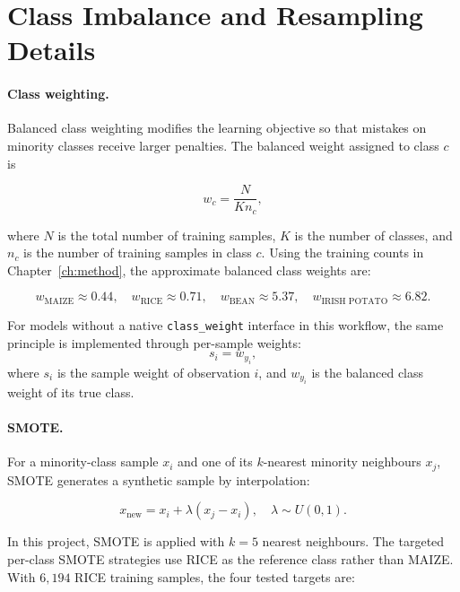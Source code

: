 \section{Class Imbalance and Resampling Details}

\paragraph{Class weighting.}
Balanced class weighting modifies the learning objective so that mistakes
on minority classes receive larger penalties. The balanced weight assigned
to class \(c\) is

\begin{equation}
\label{eq:class_weight}
w_c =
\frac{N}{K n_c},
\end{equation}

where \(N\) is the total number of training samples, \(K\) is the number
of classes, and \(n_c\) is the number of training samples in class \(c\).
Using the training counts in Chapter~\ref{ch:method}, the approximate
balanced class weights are:

\[
w_{\text{MAIZE}} \approx 0.44,\quad
w_{\text{RICE}} \approx 0.71,\quad
w_{\text{BEAN}} \approx 5.37,\quad
w_{\text{IRISH POTATO}} \approx 6.82.
\]

For models without a native \texttt{class\_weight} interface in this
workflow, the same principle is implemented through per-sample weights:
\begin{equation}
\label{eq:sample_weight}
s_i = w_{y_i},
\end{equation}
where \(s_i\) is the sample weight of observation \(i\), and \(w_{y_i}\)
is the balanced class weight of its true class.

\paragraph{SMOTE.}
For a minority-class sample \(x_i\) and one of its \(k\)-nearest minority
neighbours \(x_j\), SMOTE generates a synthetic sample by interpolation:

\begin{equation}
\label{eq:smote_formula}
x_{\mathrm{new}}
=
x_i + \lambda (x_j - x_i),
\quad
\lambda \sim U(0,1).
\end{equation}

In this project, SMOTE is applied with \(k=5\) nearest neighbours. The
targeted per-class SMOTE strategies use RICE as the reference class rather
than MAIZE. With \(6{,}194\) RICE training samples, the four tested targets
are:

